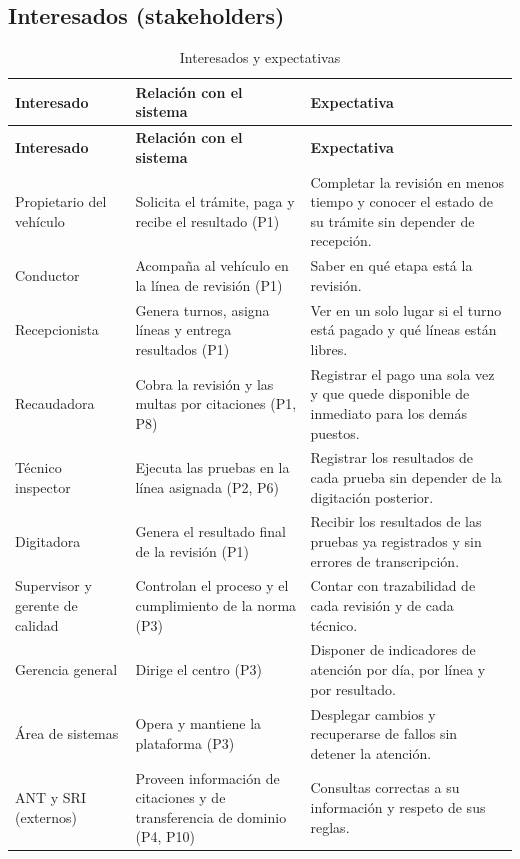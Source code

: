 \documentclass[11pt,a4paper]{article}
\begin{document}
\subsection{Interesados (stakeholders)}
\begin{xltabular}{\textwidth}{L{3.3cm}L{4.5cm}X}
  \caption{Interesados y expectativas}\label{tab:stakeholders}\\
  \toprule
  \textbf{Interesado} & \textbf{Relación con el sistema} & \textbf{Expectativa} \\
  \midrule
  \endfirsthead
  \toprule
  \textbf{Interesado} & \textbf{Relación con el sistema} & \textbf{Expectativa} \\
  \midrule
  \endhead
  \bottomrule
  \endfoot
  Propietario del vehículo & Solicita el trámite, paga y recibe el resultado (P1) & Completar la revisión en menos tiempo y conocer el estado de su trámite sin depender de recepción. \\
  Conductor & Acompaña al vehículo en la línea de revisión (P1) & Saber en qué etapa está la revisión. \\
  Recepcionista & Genera turnos, asigna líneas y entrega resultados (P1) & Ver en un solo lugar si el turno está pagado y qué líneas están libres. \\
  Recaudadora & Cobra la revisión y las multas por citaciones (P1, P8) & Registrar el pago una sola vez y que quede disponible de inmediato para los demás puestos. \\
  Técnico inspector & Ejecuta las pruebas en la línea asignada (P2, P6) & Registrar los resultados de cada prueba sin depender de la digitación posterior. \\
  Digitadora & Genera el resultado final de la revisión (P1) & Recibir los resultados de las pruebas ya registrados y sin errores de transcripción. \\
  Supervisor y gerente de calidad & Controlan el proceso y el cumplimiento de la norma (P3) & Contar con trazabilidad de cada revisión y de cada técnico. \\
  Gerencia general & Dirige el centro (P3) & Disponer de indicadores de atención por día, por línea y por resultado. \\
  Área de sistemas & Opera y mantiene la plataforma (P3) & Desplegar cambios y recuperarse de fallos sin detener la atención. \\
  ANT y SRI (externos) & Proveen información de citaciones y de transferencia de dominio (P4, P10) & Consultas correctas a su información y respeto de sus reglas. \\
\end{xltabular}
\end{document}
